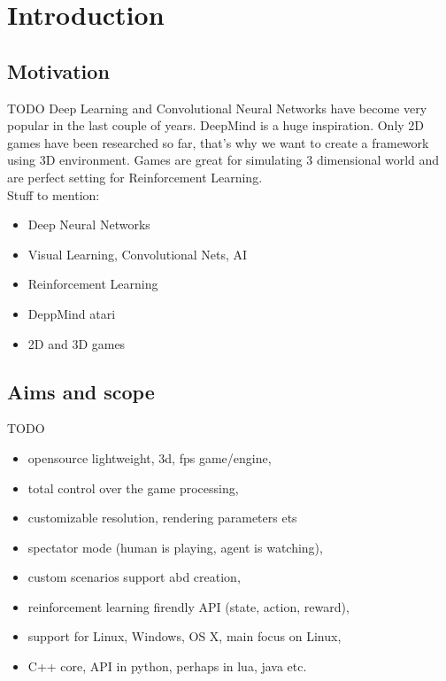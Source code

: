 
\chapter{Introduction}

\section{Motivation}
TODO
Deep Learning and Convolutional Neural Networks have become very popular in the last couple of years. DeepMind is a huge inspiration. Only 2D games have been researched so far, that's why we want to create a framework using 3D environment. Games are great for simulating 3 dimensional world and are perfect setting for Reinforcement Learning.\\
Stuff to mention:
\begin{itemize}
	\item Deep Neural Networks
	\item Visual Learning, Convolutional Nets, AI
	\item Reinforcement Learning
	\item DeppMind atari
	\item 2D and 3D games
\end{itemize}

\section{Aims and scope}
TODO
\begin{itemize}
	\item opensource lightweight, 3d, fps game/engine,
	\item total control over the game processing,
	\item customizable resolution, rendering parameters ets
	\item spectator mode (human is playing, agent is watching),
	\item custom scenarios support abd creation,
	\item reinforcement learning firendly API (state, action, reward),
	\item support for Linux, Windows, OS X, main focus on Linux,
	\item C++ core, API in python, perhaps in lua, java etc.
\end{itemize}
	


